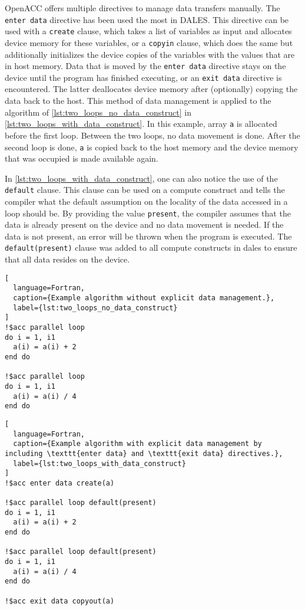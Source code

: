 OpenACC offers multiple directives to manage data transfers manually. The \texttt{enter data} directive has been used the most in DALES. This directive can be used with a \texttt{create} clause, which takes a list of variables as input and allocates device memory for these variables, or a \texttt{copyin} clause, which does the same but additionally initializes the device copies of the variables with the values that are in host memory. Data that is moved by the \texttt{enter data} directive stays on the device until the program has finished executing, or an \texttt{exit data} directive is encountered. The latter deallocates device memory after (optionally) copying the data back to the host. This method of data management is applied to the algorithm of \autoref{lst:two_loops_no_data_construct} in \autoref{lst:two_loops_with_data_construct}. In this example, array \texttt{a} is allocated before the first loop. Between the two loops, no data movement is done. After the second loop is done, \texttt{a} is copied back to the host memory and the device memory that was occupied is made available again.

In \autoref{lst:two_loops_with_data_construct}, one can also notice the use of the \texttt{default} clause. This clause can be used on a compute construct and tells the compiler what the default assumption on the locality of the data accessed in a loop should be. By providing the value \texttt{present}, the compiler assumes that the data is already present on the device and no data movement is needed. If the data is not present, an error will be thrown when the program is executed. The \texttt{default(present)} clause was added to all compute constructs in \acrshort{dales} to ensure that all data resides on the device.

\begin{lstlisting}[
  language=Fortran,
  caption={Example algorithm without explicit data management.},
  label={lst:two_loops_no_data_construct}
]
!$acc parallel loop
do i = 1, i1
  a(i) = a(i) + 2
end do

!$acc parallel loop
do i = 1, i1
  a(i) = a(i) / 4
end do
\end{lstlisting}

\begin{lstlisting}[
  language=Fortran,
  caption={Example algorithm with explicit data management by including \texttt{enter data} and \texttt{exit data} directives.},
  label={lst:two_loops_with_data_construct}
]
!$acc enter data create(a)

!$acc parallel loop default(present)
do i = 1, i1
  a(i) = a(i) + 2
end do

!$acc parallel loop default(present)
do i = 1, i1
  a(i) = a(i) / 4
end do

!$acc exit data copyout(a)
\end{lstlisting}

